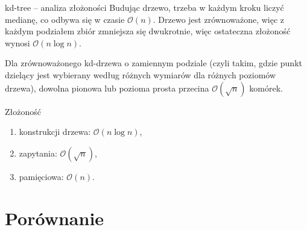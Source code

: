 \documentclass[aspectratio=169,dvipsnames]{beamer}
\newcommand{\sO}{\mathcal O}
\begin{document}
\begin{frame}{kd-tree -- analiza złożoności}
    Budując drzewo, trzeba w każdym kroku liczyć medianę, co odbywa się w czasie $\sO(n)$.
    Drzewo jest zrównoważone, więc z każdym podziałem zbiór zmniejsza się dwukrotnie,
    więc ostateczna złożoność wynosi $\sO(n \log n)$.

    \pause
    \begin{lemma}[o kd-drzewie]
        Dla zrównoważonego kd-drzewa o zamiennym podziale (czyli takim, gdzie punkt dzielący jest wybierany według różnych wymiarów dla różnych poziomów drzewa), dowolna pionowa lub pozioma prosta przecina $\sO(\sqrt n)$ komórek.
    \end{lemma}

    Złożoność
    \begin{enumerate}
        \item konstrukcji drzewa: $\sO(n\log n)$,
        \item zapytania: $\sO(\sqrt n)$,
        \item pamięciowa: $\sO(n)$.
    \end{enumerate}
\end{frame}

\section{Porównanie}
\end{document}
